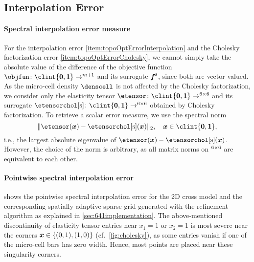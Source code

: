 \subsection{Interpolation Error}
\label{sec:643interpolation}

\paragraph{Spectral interpolation error measure}

For the interpolation error \ref{item:topoOptErrorInterpolation} and
the Cholesky factorization error \ref{item:topoOptErrorCholesky},
we cannot simply take the absolute value of the difference
of the objective function $\*\objfun\colon \clint{\*0, \*1} \to \real^{m+1}$
and its surrogate $\vsgintp$, since both are vector-valued.
As the micro-cell density $\denscell$
is not affected by the Cholesky factorization,
we consider only the elasticity tensor
$\etensor\colon \clint{\*0, \*1} \to \real^{6 \times 6}$ and
its surrogate
$\etensorcholintp\colon \clint{\*0, \*1} \to \real^{6 \times 6}$
obtained by Cholesky factorization.
To retrieve a scalar error measure,
we use the spectral norm
\begin{equation}
  \norm[2]{\etensor(\*x) - \etensorcholintp(\*x)},\quad
  \*x \in \clint{\*0, \*1},
\end{equation}
i.e., the largest absolute eigenvalue of
$\etensor(\*x) - \etensorcholintp(\*x)$.
However, the choice of the norm is arbitrary,
as all matrix norms on $\real^{6 \times 6}$ are equivalent to each other.

\paragraph{Pointwise spectral interpolation error}

shows the pointwise spectral interpolation error for the 2D cross model
and the corresponding spatially adaptive sparse grid
generated with the refinement algorithm as explained in
\cref{sec:641implementation}.
The above-mentioned discontinuity of elasticity tensor entries
near $x_1 = 1$ or $x_2 = 1$
is most severe near the corners ${\boldsymbol{x}} \in \{(0, 1), (1, 0)\}$
(cf.\ \cref{fig:cholesky}),
as some entries vanish if one of the micro-cell bars has zero width.
Hence, most points are placed near these singularity corners.

